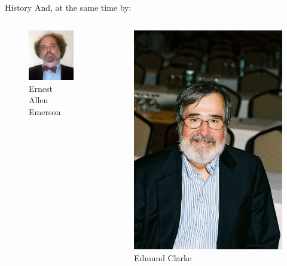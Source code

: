 \begin{frame}{History}
    And, at the same time by:
    
    \begin{columns}[c]
        \begin{column}{.3\textwidth}
            \begin{figure}
                \includegraphics[scale=0.5]{images/E_Allen_Emerson.jpg}
                \caption{Ernest Allen Emerson}
            \end{figure}
        \end{column}
        \begin{column}{.3\textwidth}
            \begin{figure}
                \includegraphics[scale=0.17]{images/Edmund_Clarke.jpg}
                \caption{Edmund Clarke}
            \end{figure}
        \end{column}
    \end{columns}
    
\end{frame}